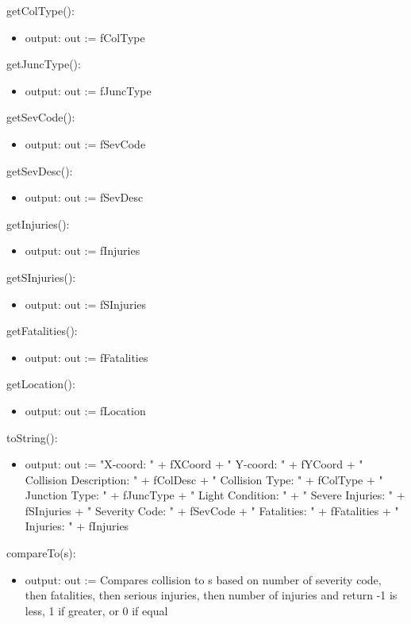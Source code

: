 \documentclass[12pt]{article}
\begin{document}
\noindent getColType():
\begin{itemize}
    \item output: out := fColType
\end{itemize}

\noindent getJuncType():
\begin{itemize}
    \item output: out := fJuncType
\end{itemize}

\noindent getSevCode():
\begin{itemize}
    \item output: out := fSevCode
\end{itemize}

\noindent getSevDesc():
\begin{itemize}
    \item output: out := fSevDesc
\end{itemize}

\noindent getInjuries():
\begin{itemize}
    \item output: out := fInjuries
\end{itemize}

\noindent getSInjuries():
\begin{itemize}
    \item output: out := fSInjuries
\end{itemize}

\noindent getFatalities():
\begin{itemize}
    \item output: out := fFatalities
\end{itemize}

\noindent getLocation():
\begin{itemize}
    \item output: out := fLocation
\end{itemize}

\noindent toString():
\begin{itemize}
    \item output: out := "X-coord: " + fXCoord + " Y-coord: " + fYCoord + " Collision Description: " + fColDesc + " Collision Type: " + fColType + " Junction Type: " + fJuncType + " Light Condition: " + " Severe Injuries: " + fSInjuries + " Severity Code: " + fSevCode + " Fatalities: " + fFatalities + " Injuries: " + fInjuries
\end{itemize}

\noindent compareTo(s):
\begin{itemize}
    \item output: out := Compares collision to s based on number of severity code, then fatalities, then serious injuries, then number of injuries and return -1 is less, 1 if greater, or 0 if equal
\end{itemize}
\end{document}
